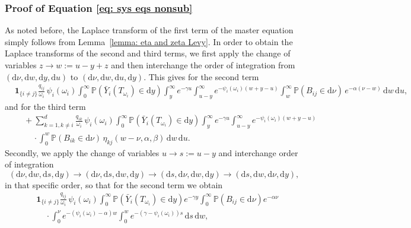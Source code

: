 \documentclass[reqno,12pt]{amsart}
\newcommand{\bs}{\boldsymbol}
\begin{document}
{\subsubsection*{Proof of Equation \eqref{eq: sys eqs nonsub}}
As noted before, the Laplace transform of the first term of the master equation simply follows from Lemma~\ref{lemma: eta and zeta Levy}. In order to obtain the Laplace transforms of the second and third terms, we first apply the change of variables $z\rightarrow w := u - y + z$ and then interchange the order of integration from $(\mathrm{d}\nu, \mathrm{d}w, \mathrm{d}y, \mathrm{d}u)$ to $(\mathrm{d}\nu, \mathrm{d}w, \mathrm{d}u, \mathrm{d}y)$.  This gives for the second term
\begin{align*}
    & {\bs 1}_{\{i\neq j\}}\frac{q_{ij}}{\omega_i}\,\psi_i(\omega_i)\int_0^\infty \mathbb{P}\left(\bar{Y}_i(T_{\omega_i})\in\mathrm{d}y\right) \int_y^\infty e^{-\gamma u} \int_{u-y}^\infty e^{-\psi_i(\omega_i) (w+y-u)} \int_{w}^\infty \mathbb{P}\left(B_{ij}\in\mathrm{d}\nu\right)\,e^{-\alpha(\nu-w)}\,{\mathrm d}w\,\mathrm{d}u,
\end{align*}
and for the third term
\begin{align*}
    &\:\:\:\:\:+ \sum_{k=1,k\neq i}^d \frac{q_{ik}}{\omega_i}\,\psi_i(\omega_i) \int_0^\infty  \mathbb{P}\left(\bar{Y}_i(T_{\omega_i})\in\mathrm{d}y\right) \int_y^\infty e^{-\gamma u} \int_{u-y}^\infty e^{-\psi_i(\omega_i) (w+y-u)}\\
    & \:\:\:\:\:\:\:\:\:\:\cdot\int_{0}^{w} \mathbb{P}\left(B_{ik}\in\mathrm{d}\nu\right)\,\eta_{kj}(w-\nu, \alpha,\beta)\,{\mathrm d}w\,\mathrm{d}u.
\end{align*}
Secondly, we apply the change of variables $u \to s := u-y$ and interchange order of integration 
\begin{equation*}
    (\mathrm{d}\nu, \mathrm{d}w, \mathrm{d}s, \mathrm{d}y) \to (\mathrm{d}\nu, \mathrm{d}s, \mathrm{d}w, \mathrm{d}y) \to (\mathrm{d}s, \mathrm{d}\nu, \mathrm{d}w, \mathrm{d}y) \to (\mathrm{d}s, \mathrm{d}w, \mathrm{d}\nu, \mathrm{d}y),
\end{equation*}
in that specific order, so that for the second term we obtain
\begin{align*}
    &{\bs 1}_{\{i\neq j\}}\frac{q_{ij}}{\omega_i}\,\psi_i(\omega_i)\int_0^\infty \mathbb{P}\left(\bar{Y}_i(T_{\omega_i})\in\mathrm{d}y\right) e^{-\gamma y} \int_0^\infty \mathbb{P}\left(B_{ij}\in\mathrm{d}\nu\right) e^{-\alpha\nu} \\
    &\:\:\:\:\:\cdot\int_0^\nu e^{-(\psi_i(\omega_i)-\alpha)w} \int_0^w e^{-(\gamma-\psi_i(\omega_i))s}\,\mathrm{d}s\,\mathrm{d}w,

\end{align*}}
\end{document}
